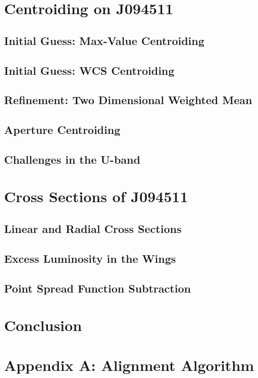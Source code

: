 \documentclass[a4paper,11pt]{article}
\begin{document}
\section{Centroiding on J094511}
\subsection{Initial Guess: Max-Value Centroiding}
\subsection{Initial Guess: WCS Centroiding}
\cite{lang_2010}
\cite{greisen_2002}
\cite{calabretta_2002}
\subsection{Refinement: Two Dimensional Weighted Mean}
\subsection{Aperture Centroiding}
\subsection{Challenges in the U-band}
\section{Cross Sections of J094511}
\subsection{Linear and Radial Cross Sections}
\subsection{Excess Luminosity in the Wings}
\subsection{Point Spread Function Subtraction}

\section{Conclusion}

\printbibliography

\section*{Appendix A: Alignment Algorithm}
\end{document}
